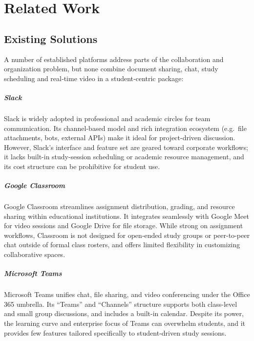 \chapter{Related Work}\label{chapter:chap2}

\section{Existing Solutions}

A number of established platforms address parts of the collaboration and organization problem, but none combine document sharing, chat, study scheduling and real‐time video in a student‐centric package:

\paragraph{Slack}\cite{Slack}  
Slack is widely adopted in professional and academic circles for team communication.  Its channel-based model and rich integration ecosystem (e.g.\ file attachments, bots, external APIs) make it ideal for project-driven discussion.  However, Slack’s interface and feature set are geared toward corporate workflows; it lacks built-in study-session scheduling or academic resource management, and its cost structure can be prohibitive for student use.

\paragraph{Google Classroom}\cite{Classroom}  
Google Classroom streamlines assignment distribution, grading, and resource sharing within educational institutions.  It integrates seamlessly with Google Meet for video sessions and Google Drive for file storage.  While strong on assignment workflows, Classroom is not designed for open‐ended study groups or peer-to-peer chat outside of formal class rosters, and offers limited flexibility in customizing collaborative spaces.

\paragraph{Microsoft Teams}\cite{Teams}  
Microsoft Teams unifies chat, file sharing, and video conferencing under the Office 365 umbrella.  Its “Teams” and “Channels” structure supports both class-level and small group discussions, and includes a built-in calendar.  Despite its power, the learning curve and enterprise focus of Teams can overwhelm students, and it provides few features tailored specifically to student-driven study sessions.

